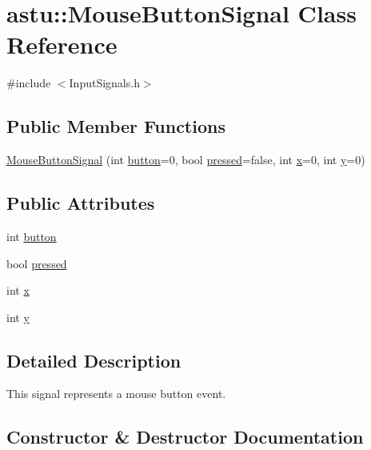 \hypertarget{classastu_1_1MouseButtonSignal}{}\section{astu\+:\+:Mouse\+Button\+Signal Class Reference}
\label{classastu_1_1MouseButtonSignal}


{\ttfamily \#include $<$Input\+Signals.\+h$>$}

\subsection*{Public Member Functions}
\begin{DoxyCompactItemize}
\item 
\hyperlink{classastu_1_1MouseButtonSignal_aa6c4fc958a4ae6296417ca592687e1fb}{Mouse\+Button\+Signal} (int \hyperlink{classastu_1_1MouseButtonSignal_af967bfc35fdd5922bbb4392f1112a153}{button}=0, bool \hyperlink{classastu_1_1MouseButtonSignal_af4ad650f957d9b61e3a52bf2624777ae}{pressed}=false, int \hyperlink{classastu_1_1MouseButtonSignal_ae6ecc707c5ea1b1c4a85f225a6110e56}{x}=0, int \hyperlink{classastu_1_1MouseButtonSignal_adae8e9d0d9bee2565248f90bde89bbd2}{y}=0)
\end{DoxyCompactItemize}
\subsection*{Public Attributes}
\begin{DoxyCompactItemize}
\item 
int \hyperlink{classastu_1_1MouseButtonSignal_af967bfc35fdd5922bbb4392f1112a153}{button}
\item 
bool \hyperlink{classastu_1_1MouseButtonSignal_af4ad650f957d9b61e3a52bf2624777ae}{pressed}
\item 
int \hyperlink{classastu_1_1MouseButtonSignal_ae6ecc707c5ea1b1c4a85f225a6110e56}{x}
\item 
int \hyperlink{classastu_1_1MouseButtonSignal_adae8e9d0d9bee2565248f90bde89bbd2}{y}
\end{DoxyCompactItemize}


\subsection{Detailed Description}
This signal represents a mouse button event. 

\subsection{Constructor \& Destructor Documentation}
\mbox{\label{classastu_1_1MouseButtonSignal_aa6c4fc958a4ae6296417ca592687e1fb}} 
